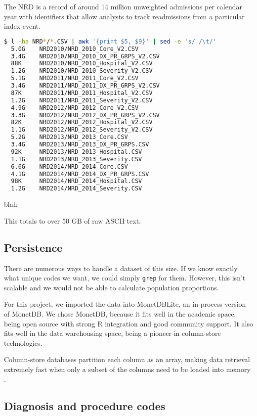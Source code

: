 The NRD is a record of around 14 million unweighted admissions per calendar year with identifiers that allow analysts 
to track readmissions from a particular index event.

\centering
\begin{lstlisting}[language=Bash]
  $ l -ha NRD*/*.CSV | awk '{print $5, $9}' | sed -e 's/ /\t/'
  5.0G    NRD2010/NRD_2010_Core_V2.CSV
  3.4G    NRD2010/NRD_2010_DX_PR_GRPS_V2.CSV
  88K     NRD2010/NRD_2010_Hospital_V2.CSV
  1.2G    NRD2010/NRD_2010_Severity_V2.CSV
  5.1G    NRD2011/NRD_2011_Core_V2.CSV
  3.4G    NRD2011/NRD_2011_DX_PR_GRPS_V2.CSV
  87K     NRD2011/NRD_2011_Hospital_V2.CSV
  1.2G    NRD2011/NRD_2011_Severity_V2.CSV
  4.9G    NRD2012/NRD_2012_Core_V2.CSV
  3.3G    NRD2012/NRD_2012_DX_PR_GRPS_V2.CSV
  82K     NRD2012/NRD_2012_Hospital_V2.CSV
  1.1G    NRD2012/NRD_2012_Severity_V2.CSV
  5.2G    NRD2013/NRD_2013_Core.CSV
  3.4G    NRD2013/NRD_2013_DX_PR_GRPS.CSV
  92K     NRD2013/NRD_2013_Hospital.CSV
  1.1G    NRD2013/NRD_2013_Severity.CSV
  6.6G    NRD2014/NRD_2014_Core.CSV
  4.1G    NRD2014/NRD_2014_DX_PR_GRPS.CSV
  98K     NRD2014/NRD_2014_Hospital.CSV
  1.2G    NRD2014/NRD_2014_Severity.CSV
\end{lstlisting}
\label{fig:nrd-size} 
\caption{blah}

This totals to over 50 GB of raw ASCII text. 

\subsection{Persistence}

There are numerous ways to handle a dataset of this size. If we know exactly what unique codes we want,
we could simply \texttt{grep} for them. However, this isn't scalable and we would not be able to calculate
population proportions.

For this project, we imported the data into MonetDBLite, an in-process version of MonetDB. 
We chose MonetDB, because it fits well in the academic space, being open source with strong R 
integration and good community support.
It also fits well in the data warehousing space, being a pioneer in column-store technologies. 

Column-store databases partition each column as an array, making data retrieval extremely fast when
only a subset of the columns need to be loaded into memory \cite{MonetDB}.

\subsection{Diagnosis and procedure codes}

